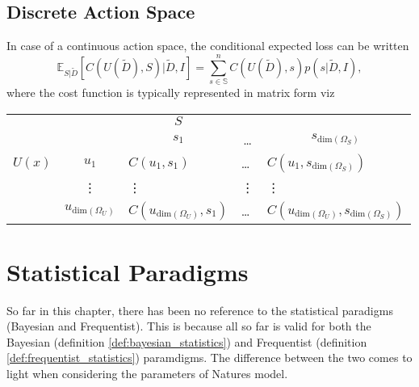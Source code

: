 \subsection{Discrete Action Space}
In case of a continuous action space, the conditional expected loss can be written
\begin{equation}
	\mathbb{E}_{S|\tilde{D}}[C(U(\tilde{D}), S)|\tilde{D},I] = \sum_{s\in \mathbb{S}}^nC(U(\tilde{D}),s)p(s|\tilde{D},I),
\end{equation}
where the cost function is typically represented in matrix form viz
\begin{center}
	\begin{tabular}{ c  c  c  c  c  }
		&& $S$& & \\
		&& $s_1$ & \dots & $s_{\text{dim}(\Omega_S)}$ \\
		\cline{3-5}
		$U(x)$ & $u_1$& \multicolumn{1}{|l}{$C(u_1, s_1)$} &\multicolumn{1}{l}{\dots}&\multicolumn{1}{l|}{$C(u_1, s_{\text{dim}(\Omega_S)})$} \\
		& \vdots & \multicolumn{1}{|l}{\vdots} &\multicolumn{1}{l}{\vdots}&\multicolumn{1}{l|}{\vdots} \\
		& $u_{\text{dim}(\Omega_U)}$ & \multicolumn{1}{|l}{$C(u_{\text{dim}(\Omega_U)}, s_1)$} &\multicolumn{1}{l}{\dots}&\multicolumn{1}{l|}{$C(u_{\text{dim}(\Omega_U)}, s_{\text{dim}(\Omega_S)})$} \\
		\cline{3-5}
	\end{tabular}
\end{center}

\section{Statistical Paradigms}
So far in this chapter, there has been no reference to the statistical paradigms (Bayesian and Frequentist). This is because all so far is valid for both the Bayesian (definition \ref{def:bayesian_statistics}) and Frequentist (definition \ref{def:frequentist_statistics}) paramdigms. The difference between the two comes to light when considering the parameters of Natures model.  

